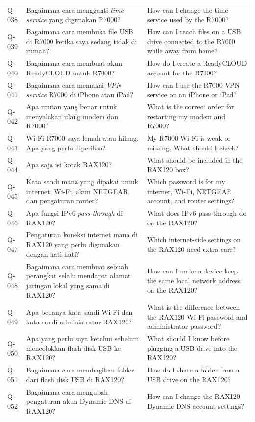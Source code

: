 \begin{longtable}{@{}>{\RaggedRight\arraybackslash}p{1.6cm}>{\RaggedRight\arraybackslash}p{5.8cm}>{\RaggedRight\arraybackslash}p{\dimexpr\textwidth-1.6cm-5.8cm-4\tabcolsep\relax}@{}}
Q-038 & Bagaimana cara mengganti \emph{time service} yang digunakan R7000? & How can I change the time service used by the R7000? \\
Q-039 & Bagaimana cara membuka file USB di R7000 ketika saya sedang tidak di rumah? & How can I reach files on a USB drive connected to the R7000 while away from home? \\
Q-040 & Bagaimana cara membuat akun ReadyCLOUD untuk R7000? & How do I create a ReadyCLOUD account for the R7000? \\
Q-041 & Bagaimana cara memakai \emph{VPN service} R7000 di iPhone atau iPad? & How can I use the R7000 VPN service on an iPhone or iPad? \\
Q-042 & Apa urutan yang benar untuk menyalakan ulang modem dan R7000? & What is the correct order for restarting my modem and R7000? \\
Q-043 & Wi-Fi R7000 saya lemah atau hilang. Apa yang perlu diperiksa? & My R7000 Wi-Fi is weak or missing. What should I check? \\
Q-044 & Apa saja isi kotak RAX120? & What should be included in the RAX120 box? \\
Q-045 & Kata sandi mana yang dipakai untuk internet, Wi-Fi, akun NETGEAR, dan pengaturan router? & Which password is for my internet, Wi-Fi, NETGEAR account, and router settings? \\
Q-046 & Apa fungsi IPv6 \emph{pass-through} di RAX120? & What does IPv6 pass-through do on the RAX120? \\
Q-047 & Pengaturan koneksi internet mana di RAX120 yang perlu digunakan dengan hati-hati? & Which internet-side settings on the RAX120 need extra care? \\
Q-048 & Bagaimana cara membuat sebuah perangkat selalu mendapat alamat jaringan lokal yang sama di RAX120? & How can I make a device keep the same local network address on the RAX120? \\
Q-049 & Apa bedanya kata sandi Wi-Fi dan kata sandi administrator RAX120? & What is the difference between the RAX120 Wi-Fi password and administrator password? \\
Q-050 & Apa yang perlu saya ketahui sebelum mencolokkan flash disk USB ke RAX120? & What should I know before plugging a USB drive into the RAX120? \\
Q-051 & Bagaimana cara membagikan folder dari flash disk USB di RAX120? & How do I share a folder from a USB drive on the RAX120? \\
Q-052 & Bagaimana cara mengubah pengaturan akun Dynamic DNS di RAX120? & How can I change the RAX120 Dynamic DNS account settings? \\

\end{longtable}
